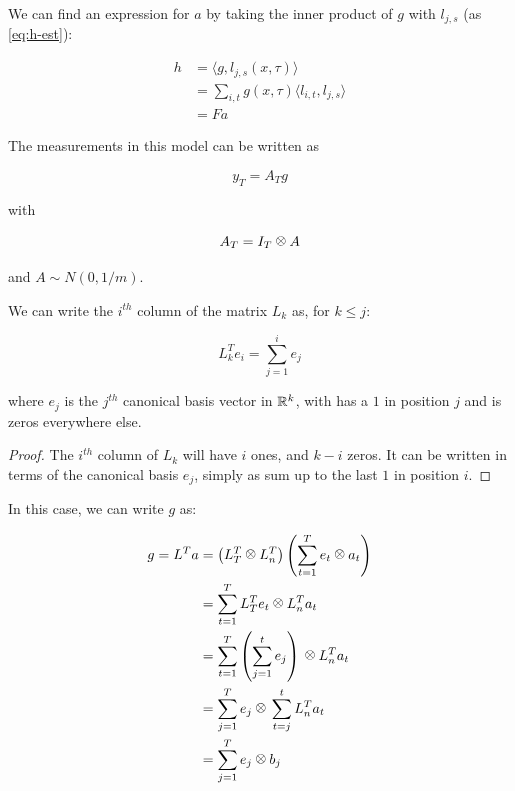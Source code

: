 We can find an expression for \(a\) by taking the inner product of \(g\) with \(l_{j,s}\) (as \eqref{eq:h-est}):

\begin{align*}
h &= \langle g, l_{j,s}\left(x, \tau\right)\rangle \\
&= \sum_{i,t} g(x,\tau) \langle l_{i,t}, l_{j,s} \rangle \\
&= Fa
\end{align*}

The measurements in this model can be written as

\begin{equation}
y_T = A_Tg
\end{equation}

with 

\begin{equation}
A_T = I_T \kronecker A
\end{equation}

and \(A \sim N(0, 1/m)\).

\begin{proposition}
We can write the \(i^{th}\) column of the matrix \(L_k\) as, for \(k \leq j\):

\begin{equation}
L_k^T e_i = \sum_{j=1}^i e_j
\end{equation}

where \(e_j\) is the \(j^{th}\) canonical basis vector in \({\mathbb{R}}^k\), with has a \(1\) in position \(j\) and is zeros everywhere else.

\begin{proof}
The \(i^{th}\) column of \(L_k\) will have \(i\) ones, and \(k-i\) zeros. It can be written in terms of the canonical basis \(e_j\), simply as sum up to the last \(1\) in position \(i\).
\end{proof}

\end{proposition}

In this case, we can write \(g\) as:

\begin{align*}
g = L^T a &= \left(L_T^T \kronecker L_n^T\right)\left(\sum_{t=1}^T e_t \kronecker a_t\right) \\
&= \sum_{t=1}^T L_T^T e_t \kronecker L_n^Ta_t \\
&= \sum_{t=1}^T \left(\sum_{j=1}^t e_j \right) \kronecker L_n^T a_t \\
&= \sum_{j=1}^T e_j \kronecker \sum_{t=j}^t L_n^T a_t \\
&= \sum_{j=1}^T e_j \kronecker b_j
\end{align*}

